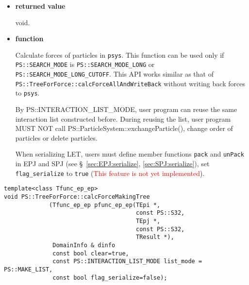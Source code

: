 \begin{itemize}
\item {\bf returned value}

void.

\item {\bf function}

Calculate forces of particles in {\tt psys}. This function can be used only if {\tt PS::SEARCH\_MODE} is {\tt PS::SEARCH\_MODE\_LONG} or {\tt PS::SEARCH\_MODE\_LONG\_CUTOFF}. This API works similar as that of {\tt PS::TreeForForce::calcForceAllAndWriteBack} without writing back forces to {\tt psys}.

By PS::INTERACTION\_LIST\_MODE, user program can reuse the same interaction list constructed before. During reusing the list, user program MUST NOT call \newline PS::ParticleSystem::exchangeParticle(), change order of particles or delete particles.

When serializing LET, users must define member functions \texttt{pack} and \texttt{unPack} in EPJ and SPJ (see \S~\ref{sec:EPJ:serialize}, \ref{sec:SPJ:serialize}), set \texttt{flag\_serialize} to \texttt{true} (\textcolor{red}{This feature is not yet implemented}).

\end{itemize}


\begin{screen}
\begin{verbatim}
template<class Tfunc_ep_ep>
void PS::TreeForForce::calcForceMakingTree
             (Tfunc_ep_ep pfunc_ep_ep(TEpi *,
                                      const PS::S32,
                                      TEpj *,
                                      const PS::S32,
                                      TResult *),
              DomainInfo & dinfo
              const bool clear=true,
              const PS::INTERACTION_LIST_MODE list_mode = PS::MAKE_LIST,
              const bool flag_serialize=false);
\end{verbatim}
\end{screen}

